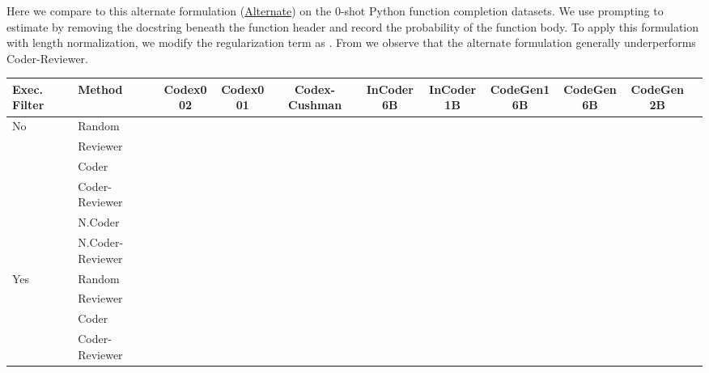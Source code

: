 \documentclass[nohyperref]{article}
\theoremstyle{plain}
\theoremstyle{definition}
\theoremstyle{remark}
\begin{document}
Here we compare to this alternate formulation (\underline{Alternate}) on the 0-shot Python function completion datasets.
We use prompting to estimate  by removing the docstring beneath the function header and record the probability of the function body.
To apply this formulation with length normalization, we modify the regularization term as .
From  we observe that the alternate formulation generally underperforms Coder-Reviewer.

\begin{table*}[]
\setlength{\tabcolsep}{1.5pt}
\footnotesize
\centering
\begin{tabular}{l|lccccccccc}
\toprule
    Exec. Filter & Method &            Codex002 &            Codex001 &       Codex-Cushman &        InCoder6B &           InCoder1B &          CodeGen16B &           CodeGen6B &           CodeGen2B \\
\midrule
\multirow{6}{*}{No} & Random &               &               &               &            &               &               &               &               \\
    & Reviewer &               &               &               &   &               &               &   &               \\
\cmidrule{2-10}
    & Coder &               &               &               &            &                &               &               &               \\
    & Coder-Reviewer &               &               &               &            &               &               &               &               \\
\cmidrule{2-10}
    & N.Coder &               &               &               &            &                &               &               &               \\
    & N.Coder-Reviewer &               &               &               &            &               &               &               &               \\
\midrule
\multirow{7}{*}{Yes} & Random &               &               &               &            &               &               &               &               \\
    & Reviewer &   &   &   &   &      &      &      &      \\
\cmidrule{2-10}
    & Coder &               &               &               &            &                &               &               &               \\
    & Coder-Reviewer &               &               &               &            &               &               &               &               \\

\end{tabular}
\end{table*}
\end{document}
